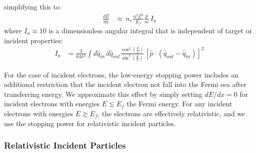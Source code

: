 \documentclass[twocolumn, preprintnumbers,amsmath,amssymb,prd, superscriptaddress]{revtex4}
\begin{document}
\begin{appendices}
simplifying this to
\begin{align}
  \frac{dE}{dx} &\approx \, n_e \frac{\alpha^2 Z^2}{E_f} \frac{p}{m} \, I_a
\end{align}
where $I_a \approx 10$ is a dimensionless angular integral that is independent of target or incident properties:
\begin{align}
   I_a &= \frac{3}{64\pi^2} \int d\hat{q}_{in} \, d\hat{q}_{out}
   \frac{\cos^2\left(\frac{\theta}{2}\right)}
        {\sin^4\left(\frac{\theta}{2}\right)}
   \, \left[\hat{p} \cdot \left(\hat{q}_{out} - \hat{q}_{in}\right)\right]^2
\end{align}

For the case of incident electrons, the low-energy stopping power includes an additional restriction that the incident electron not fall into the Fermi sea after transferring energy. We approximate this effect by simply setting $dE / d x = 0$ for incident electrons with energies $E\lesssim E_f$ the Fermi energy. For any incident electrons with energies $E\gtrsim E_f$, the electrons are effectively relativistic, and we use the stopping power for relativistic incident particles.

\subsubsection{Relativistic Incident Particles}


\end{appendices}
\end{document}

